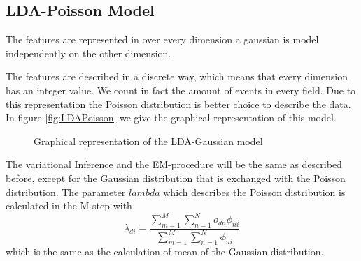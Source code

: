 \documentclass[11pt,a4paper]{article}
\begin{document}
\subsection{LDA-Poisson Model}
The features are represented in 
over every dimension a gaussian is model independently on the other dimension.

The features are described in a discrete way, which means that every dimension has an integer value. We count in fact the amount of events in every field. Due to this representation the Poisson distribution is better choice to describe the data. In figure \ref{fig:LDAPoisson} we give the graphical representation of this model.

\begin{figure}[h!]
\centering
\def\svgwidth{0.8\textwidth}

\caption{Graphical representation of the LDA-Gaussian model}
\label{fig:modelExt}
\end{figure}

The variational Inference and the EM-procedure will be the same as described before, except for the Gaussian distribution that is exchanged with the Poisson distribution. The parameter $lambda$ which describes the Poisson distribution is calculated in the M-step with
\begin{equation}
 \lambda_{di} = \frac{\sum_{m=1}^M \sum_{n=1}^N o_{dn} \phi_{ni} }{\sum_{m=1}^M \sum_{n=1}^N  \phi_{ni}}
\end{equation}
which is the same as the calculation of mean of the Gaussian distribution.
\end{document}

